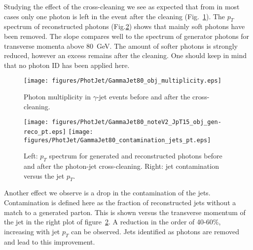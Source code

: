 \documentclass{cmspaper}
\begin{document}
Studying the effect of the cross-cleaning  we see as expected that from in most
cases only one photon is left in the event after the cleaning
(Fig.~\ref{fig:pjPhotMult}). The $p_T$ spectrum of reconstructed photons
(Fig.\ref{fig:pjPhotCont}) shows that mainly soft photons have been removed.
The slope compares well to the spectrum of generator photons for transverse
momenta above 80\ GeV. The amount of softer photons is strongly reduced,
however an excess remains after the cleaning. One should keep in mind that no
photon ID has been applied here.
\begin{figure}[hbtp]
  \begin{center}
    \texttt{[image: figures/PhotJet/GammaJet80\_obj\_multiplicity.eps]}
    \caption{Photon multiplicity in $\gamma$-jet events before and after the
    cross-cleaning.}
    \label{fig:pjPhotMult}
  \end{center}
\end{figure}
\begin{figure}[hbtp]
  \begin{center}
    \texttt{[image: figures/PhotJet/GammaJet80\_noteV2\_JpT15\_obj\_gen-reco\_pt.eps]}
    \texttt{[image: figures/PhotJet/GammaJet80\_contamination\_jets\_pt.eps]}
    \caption{Left: $p_T$ spectrum for generated and reconstructed photons
    before and after the photon-jet cross-cleaning. Right: jet contamination
    versus the jet $p_T$.}
    \label{fig:pjPhotCont}
  \end{center}
\end{figure}

Another effect we observe is a drop in the contamination of the jets.
Contamination is defined here as the fraction of reconstructed jets without a
match to a generated parton. This is shown versus the transverse momentum of
the jet in the right plot of figure~\ref{fig:pjPhotCont}. A reduction in the
order of 40-60\%, increasing with jet $p_T$ can be observed. Jets identified as
photons are removed and lead to this improvement.
\end{document}
